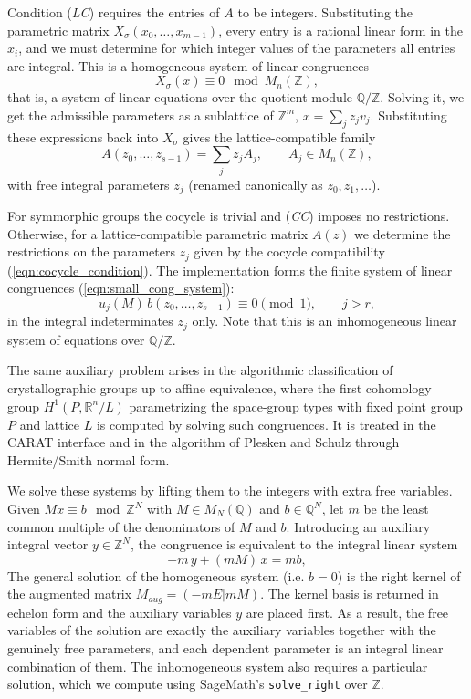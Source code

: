 \documentclass[draft]{adm-paper}
\theoremstyle{definition}
\begin{document}
Condition (\textit{LC}) requires the entries of $A$ to be integers. Substituting the
parametric matrix $X_\sigma(x_0,\dots,x_{m-1})$, every entry is a rational
linear form in the $x_i$, and we must determine for which integer values of the
parameters all entries are integral. This is a homogeneous system of linear
congruences
\[
  X_\sigma(x) \equiv 0 \mod M_n(\mathbb{Z}),
\]
that is, a system of linear equations over the quotient module
$\mathbb{Q}/\mathbb{Z}$.
Solving it, we get the admissible parameters as a sublattice of $\mathbb{Z}^m$, $x = \sum_j z_j v_j$.
Substituting these expressions back into $X_\sigma$ gives the lattice-compatible family
\[
  A(z_0, \dots, z_{s-1}) = \sum_j z_j A_j, \qquad A_j \in M_n(\mathbb{Z}),
\]
with free integral parameters $z_j$ (renamed canonically as $z_0, z_1, \dots$).

For symmorphic groups the cocycle is trivial and (\textit{CC}) imposes no restrictions. Otherwise, for a lattice-compatible
parametric matrix $A(z)$ we determine the restrictions on the parameters $z_j$
given by the cocycle compatibility (\ref{eqn:cocycle_condition}).
The implementation forms the
finite system of linear congruences (\ref{eqn:small_cong_system}):
\[
  u_j(M)\, b(z_0, \dots, z_{s-1}) \equiv 0 \pmod 1, \qquad j > r,
\]
in the integral indeterminates $z_j$ only. Note that this is an inhomogeneous linear system of equations over
$\mathbb{Q}/\mathbb{Z}$.

The same auxiliary problem arises in the algorithmic
classification of crystallographic groups up to affine equivalence, where the
first cohomology group $H^1(P, \mathbb{R}^n/L)$ parametrizing the space-group
types with fixed point group $P$ and lattice $L$ is computed by solving such
congruences. It is treated in the CARAT interface \cite{CARAT} and in the
algorithm of Plesken and Schulz \cite{Algo:Cocycle} through Hermite/Smith
normal form.

We solve these systems by lifting them to the integers with extra free variables.
Given $Mx \equiv b \mod \mathbb{Z}^N$ with $M \in M_N(\mathbb{Q})$ and
$b \in \mathbb{Q}^N$, let $m$ be the least common multiple of the denominators
of $M$ and $b$. Introducing an auxiliary integral vector $y \in \mathbb{Z}^N$,
the congruence is equivalent to the integral linear system
\[
  -m\,y + (mM)\,x = mb,
\]
The general solution of the homogeneous system (i.e. $b = 0$) is the right kernel of the augmented matrix
$M_{aug} = \left(-mE | mM \right)$. The kernel basis is returned in echelon form and the auxiliary variables $y$
are placed first. As a result, the free variables of the solution are exactly the auxiliary variables together with the
genuinely free parameters, and each dependent parameter is an integral linear
combination of them. The inhomogeneous system also requires a particular solution, which we compute using
SageMath's \texttt{solve\_right} over $\mathbb{Z}$.
\end{document}
